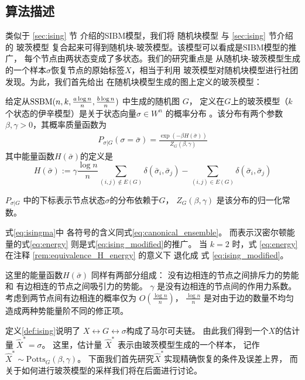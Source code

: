 \subsection{算法描述}
类似于 \ref{sec:ising} 节
介绍的SIBM模型，我们将
随机块模型
与 \ref{sec:ising} 节介绍的 玻茨模型
复合起来可得到随机块-玻茨模型。该模型可以看成是SIBM模型的推广，
每个节点由两状态变成了多状态。我们的研究重点是
从随机块-玻茨模型生成的一个样本$\sigma$恢复节点的原始标签$X$，相当于利用
玻茨模型对随机块模型进行社团发现。为此，我们首先给出
在随机块模型生成的图上定义的玻茨模型：
\begin{definition}\label{def:ising}
	给定从$\operatorname{SSBM}(n,k,\frac{a \log n}{n},\frac{b \log n}{n})$ 中生成的随机图 $G$，
    定义在$G$上的玻茨模型（$k$个状态的伊辛模型）是关于状态向量$\sigma\in W^n$ 的概率分布
。该分布有两个参数 $\beta, \gamma>0$，其概率质量函数为
\begin{align} \label{eq:isingma}
	P_{\sigma|G}(\sigma=\bar{\sigma})=\frac{\exp(-\beta H(\bar{\sigma}))}{Z_G(\beta, \gamma)}
	\end{align}
其中能量函数$H(\bar{\sigma})$的定义是
\begin{equation}\label{eq:energy}
	H(\bar{\sigma}) := \gamma \frac{\log n}{n} \sum_{(i,j)\not\in E(G)} \delta(\bar{\sigma}_i, \bar{\sigma}_j)
	- \sum_{(i,j)\in E(G)} \delta(\bar{\sigma}_i, \bar{\sigma}_j)
	\end{equation}
	
	$P_{\sigma|G}$ 中的下标表示节点状态$\sigma$的分布依赖于$G$，
    $Z_G(\beta, \gamma)$ 是该分布的归一化常数。
\end{definition}

式\eqref{eq:isingma}中
各符号的含义同式\eqref{eq:canonical_ensemble}。
而表示汉密尔顿能量的式\eqref{eq:energy}
则是式\eqref{eq:ising_modified}的推广。
当  $k=2$ 时，式 \eqref{eq:energy}
在注释 \ref{rem:equivalence_H_energy} 的意义下
退化成 式 \eqref{eq:ising_modified}。 

这里的能量函数$H(\bar{\sigma})$ 同样有两部分组成：
没有边相连的节点之间排斥力的势能和
有边相连的节点之间吸引力的势能。
$\gamma$ 是没有边相连的节点间的作用力系数。
考虑到两节点间有边相连的概率仅为 $O\left(\frac{\log n}{n} \right)$，
$\frac{\log n}{n}$ 是对由于边的数量不均匀造成两种势能量阶不同的修正项。


定义\ref{def:ising}说明了 $X \leftrightarrow G \leftrightarrow \sigma$构成了马尔可夫链。
由此我们得到一个$X$的估计量 $\hat{X}^*=\sigma$。
这里，估计量 $\hat{X}^*$ 表示由玻茨模型生成的一个样本，
记作$\hat{X}^* \sim \textrm{Potts}_G(\beta, \gamma)$。
下面我们首先研究$\hat{X}^*$实现精确恢复的条件及误差上界，
而关于如何进行玻茨模型的采样我们将在后面进行讨论。
